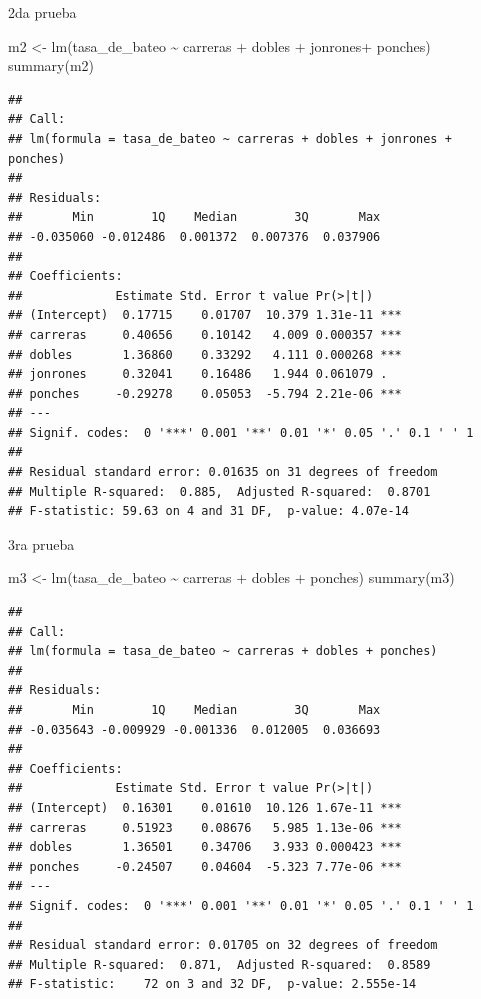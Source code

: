 \documentclass{staprojteamusb}
\newenvironment{Shaded}{\begin{snugshade}}{\end{snugshade}}
\newcommand{\FunctionTok}[1]{\textcolor[rgb]{0.00,0.00,0.00}{#1}}
\newcommand{\NormalTok}[1]{#1}
\newcommand{\OtherTok}[1]{\textcolor[rgb]{0.56,0.35,0.01}{#1}}
\newcommand{\SpecialCharTok}[1]{\textcolor[rgb]{0.00,0.00,0.00}{#1}}
\begin{document}
 2da prueba

\begin{Shaded}
\begin{Highlighting}[]
\NormalTok{m2 }\OtherTok{\textless{}{-}} \FunctionTok{lm}\NormalTok{(tasa\_de\_bateo }\SpecialCharTok{\textasciitilde{}}\NormalTok{ carreras }\SpecialCharTok{+}\NormalTok{ dobles }\SpecialCharTok{+}\NormalTok{ jonrones}\SpecialCharTok{+}\NormalTok{ ponches)}
\FunctionTok{summary}\NormalTok{(m2)}
\end{Highlighting}
\end{Shaded}

\begin{verbatim}
## 
## Call:
## lm(formula = tasa_de_bateo ~ carreras + dobles + jonrones + ponches)
## 
## Residuals:
##       Min        1Q    Median        3Q       Max 
## -0.035060 -0.012486  0.001372  0.007376  0.037906 
## 
## Coefficients:
##             Estimate Std. Error t value Pr(>|t|)    
## (Intercept)  0.17715    0.01707  10.379 1.31e-11 ***
## carreras     0.40656    0.10142   4.009 0.000357 ***
## dobles       1.36860    0.33292   4.111 0.000268 ***
## jonrones     0.32041    0.16486   1.944 0.061079 .  
## ponches     -0.29278    0.05053  -5.794 2.21e-06 ***
## ---
## Signif. codes:  0 '***' 0.001 '**' 0.01 '*' 0.05 '.' 0.1 ' ' 1
## 
## Residual standard error: 0.01635 on 31 degrees of freedom
## Multiple R-squared:  0.885,  Adjusted R-squared:  0.8701 
## F-statistic: 59.63 on 4 and 31 DF,  p-value: 4.07e-14
\end{verbatim}

 3ra prueba

\begin{Shaded}
\begin{Highlighting}[]
\NormalTok{m3 }\OtherTok{\textless{}{-}} \FunctionTok{lm}\NormalTok{(tasa\_de\_bateo }\SpecialCharTok{\textasciitilde{}}\NormalTok{ carreras }\SpecialCharTok{+}\NormalTok{ dobles }\SpecialCharTok{+}\NormalTok{ ponches)}
\FunctionTok{summary}\NormalTok{(m3)}
\end{Highlighting}
\end{Shaded}

\begin{verbatim}
## 
## Call:
## lm(formula = tasa_de_bateo ~ carreras + dobles + ponches)
## 
## Residuals:
##       Min        1Q    Median        3Q       Max 
## -0.035643 -0.009929 -0.001336  0.012005  0.036693 
## 
## Coefficients:
##             Estimate Std. Error t value Pr(>|t|)    
## (Intercept)  0.16301    0.01610  10.126 1.67e-11 ***
## carreras     0.51923    0.08676   5.985 1.13e-06 ***
## dobles       1.36501    0.34706   3.933 0.000423 ***
## ponches     -0.24507    0.04604  -5.323 7.77e-06 ***
## ---
## Signif. codes:  0 '***' 0.001 '**' 0.01 '*' 0.05 '.' 0.1 ' ' 1
## 
## Residual standard error: 0.01705 on 32 degrees of freedom
## Multiple R-squared:  0.871,  Adjusted R-squared:  0.8589 
## F-statistic:    72 on 3 and 32 DF,  p-value: 2.555e-14
\end{verbatim}
\end{document}
